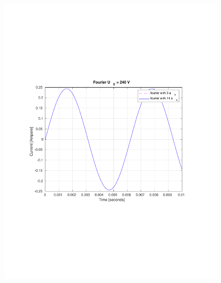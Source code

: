\documentclass[aspectratio=1610]{beamer}
\begin{document}
\begin{frame}
\begin{columns}
\begin{figure}
				\includegraphics[scale=0.4]{figs/fourier comparison 240.pdf}
			\end{figure}
	\end{columns}
\end{frame}
\end{document}
